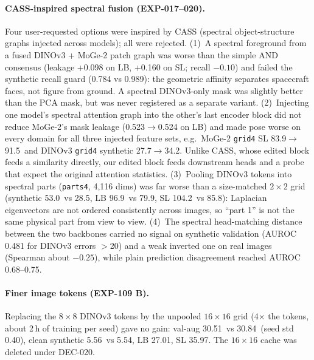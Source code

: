 \paragraph{CASS-inspired spectral fusion (EXP-017--020).}
Four user-requested options were inspired by CASS (spectral object-structure graphs injected across models); all were rejected.
(1)~A spectral foreground from a fused DINOv3 + MoGe-2 patch graph was worse than the simple AND consensus (leakage +0.098 on LB, +0.160 on SL; recall $-0.10$) and failed the synthetic recall guard (0.784 vs 0.989): the geometric affinity separates spacecraft faces, not figure from ground. A spectral DINOv3-only mask was slightly better than the PCA mask, but was never registered as a separate variant.
(2)~Injecting one model's spectral attention graph into the other's last encoder block did not reduce MoGe-2's mask leakage (0.523$\to$0.524 on LB) and made pose worse on every domain for all three injected feature sets, e.g.\ MoGe-2 \texttt{grid4} SL 83.9$\to$91.5\appDdeg\ and DINOv3 \texttt{grid4} synthetic 27.7$\to$34.2\appDdeg. Unlike CASS, whose edited block feeds a similarity directly, our edited block feeds downstream heads and a probe that expect the original attention statistics.
(3)~Pooling DINOv3 tokens into spectral parts (\texttt{parts4}, 4,116 dims) was far worse than a size-matched $2\times2$ grid (synthetic 53.0\appDdeg\ vs 28.5\appDdeg, LB 96.9\appDdeg\ vs 79.9\appDdeg, SL 104.2\appDdeg\ vs 85.8\appDdeg): Laplacian eigenvectors are not ordered consistently across images, so ``part 1'' is not the same physical part from view to view.
(4)~The spectral head-matching distance between the two backbones carried no signal on synthetic validation (AUROC 0.481 for DINOv3 errors $>$20\appDdeg) and a weak inverted one on real images (Spearman about $-0.25$), while plain prediction disagreement reached AUROC 0.68--0.75.

\paragraph{Finer image tokens (EXP-109 B).}
Replacing the $8\times8$ DINOv3 tokens by the unpooled $16\times16$ grid (4$\times$ the tokens, about 2\,h of training per seed) gave no gain: val-aug 30.51\appDdeg\ vs 30.84\appDdeg\ (seed std 0.40), clean synthetic 5.56\appDdeg\ vs 5.54\appDdeg, LB 27.01\appDdeg, SL 35.97\appDdeg. The $16\times16$ cache was deleted under DEC-020.

